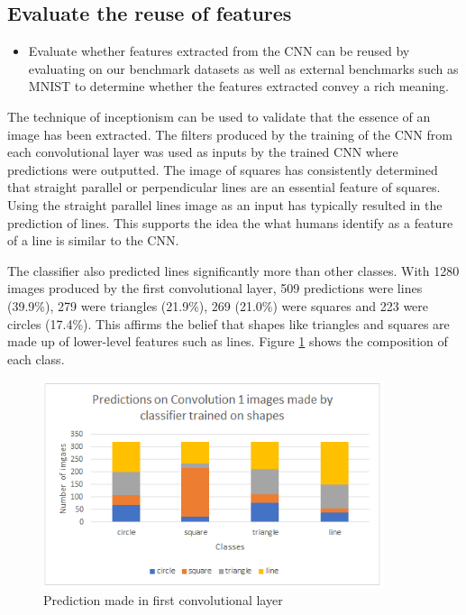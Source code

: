 \subsection{Evaluate the reuse of features} \label{subsec:reuse}
\begin{itemize}
		\item Evaluate whether features extracted from the CNN can be reused by evaluating on our benchmark datasets as well as external benchmarks such as MNIST to determine whether the features extracted convey a rich meaning.
	
\end{itemize}

The technique of inceptionism can be used to validate that the essence of an image has been extracted. The filters produced by the training of the CNN from each convolutional layer was used as inputs by the trained CNN where predictions were outputted. The image of squares has consistently determined that straight parallel or perpendicular lines are an essential feature of squares. Using the straight parallel lines image as an input has typically resulted in the prediction of lines. This supports the idea the what humans identify as a feature of a line is similar to the CNN.  

The classifier also predicted lines significantly more than other classes. With 1280 images produced by the first convolutional layer, 509 predictions were lines (39.9\%), 279 were triangles (21.9\%), 269 (21.0\%) were squares and 223 were circles (17.4\%). This affirms the belief that shapes like triangles and squares are made up of lower-level features such as lines. Figure \ref{fig:graph_conv1} shows the composition of each class. 
\begin{figure}
	\begin{center}
		\includegraphics[width=100mm, scale=1]{graph_conv1.png}
		\caption{Prediction made in first convolutional layer}
		\label{fig:graph_conv1}
	\end{center}
	
\end{figure}

